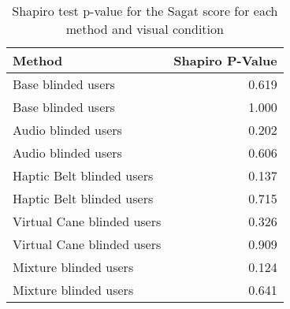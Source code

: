 
\begin{table}[!htb]
\centering
\caption{Shapiro test p-value for the Sagat score for each method and visual condition}
\label{tab:shapiro_sagat_score}
\begin{tabular}{lr}
\toprule
                    Method &  Shapiro P-Value \\
\midrule
        Base blinded users &            0.619 \\
        Base blinded users &            1.000 \\
       Audio blinded users &            0.202 \\
       Audio blinded users &            0.606 \\
 Haptic Belt blinded users &            0.137 \\
 Haptic Belt blinded users &            0.715 \\
Virtual Cane blinded users &            0.326 \\
Virtual Cane blinded users &            0.909 \\
     Mixture blinded users &            0.124 \\
     Mixture blinded users &            0.641 \\
\bottomrule
\end{tabular}
\end{table}

